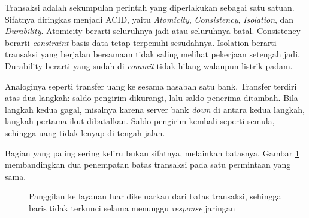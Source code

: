 Transaksi adalah sekumpulan perintah yang diperlakukan sebagai satu satuan.
Sifatnya diringkas menjadi ACID, yaitu \textit{Atomicity}, \textit{Consistency},
\textit{Isolation}, dan \textit{Durability}. Atomicity berarti seluruhnya jadi
atau seluruhnya batal. Consistency berarti \textit{constraint} basis data tetap terpenuhi
sesudahnya. Isolation berarti transaksi yang berjalan bersamaan tidak saling
melihat pekerjaan setengah jadi. Durability berarti yang sudah di-\textit{commit}
tidak hilang walaupun listrik padam.

Analoginya seperti transfer uang ke sesama nasabah satu bank. Transfer terdiri
atas dua langkah: saldo pengirim dikurangi, lalu saldo penerima ditambah. Bila
langkah kedua gagal, misalnya karena server bank \textit{down} di antara kedua langkah,
langkah pertama ikut dibatalkan. Saldo pengirim kembali seperti semula, sehingga
uang tidak lenyap di tengah jalan.

Bagian yang paling sering keliru bukan sifatnya, melainkan batasnya. Gambar
\ref{fig:batas-transaksi} membandingkan dua penempatan batas transaksi pada
satu permintaan yang sama.

\begin{figure}[!htb]
  \centering
  \caption{Panggilan ke layanan luar dikeluarkan dari batas transaksi, sehingga
           baris tidak terkunci selama menunggu \textit{response} jaringan}
  \label{fig:batas-transaksi}
\end{figure}

